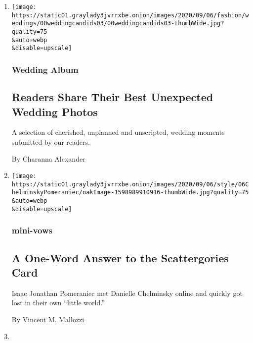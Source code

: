 \begin{enumerate}
\def\labelenumi{\arabic{enumi}.}
\item
  \href{/2020/09/05/fashion/weddings/readers-share-their-best-unexpected-wedding-photos.html}{}

  \texttt{[image: https://static01.graylady3jvrrxbe.onion/images/2020/09/06/fashion/weddings/00weddingcandids03/00weddingcandids03-thumbWide.jpg?quality=75\\\&auto=webp\\\&disable=upscale]}

  \hypertarget{wedding-album}{%
  \subsubsection{Wedding Album}\label{wedding-album}}

  \hypertarget{readers-share-their-best-unexpected-wedding-photos}{%
  \subsection{Readers Share Their Best Unexpected Wedding
  Photos}\label{readers-share-their-best-unexpected-wedding-photos}}

  A selection of cherished, unplanned and unscripted, wedding moments
  submitted by our readers.

  By Charanna Alexander
\item
  \href{/2020/09/04/fashion/weddings/a-one-word-answer-to-the-scattergories-card.html}{}

  \texttt{[image: https://static01.graylady3jvrrxbe.onion/images/2020/09/06/style/06ChelminskyPomeraniec/oakImage-1598989910916-thumbWide.jpg?quality=75\\\&auto=webp\\\&disable=upscale]}

  \hypertarget{mini-vows-1}{%
  \subsubsection{mini-vows}\label{mini-vows-1}}

  \hypertarget{a-one-word-answer-to-the-scattergories-card}{%
  \subsection{A One-Word Answer to the Scattergories
  Card}\label{a-one-word-answer-to-the-scattergories-card}}

  Isaac Jonathan Pomeraniec met Danielle Chelminsky online and quickly
  got lost in their own ``little world.''

  By Vincent M. Mallozzi
\item
  \href{/2020/09/04/fashion/weddings/more-in-common-than-it-seemed-on-paper.html}{}


\end{enumerate}
